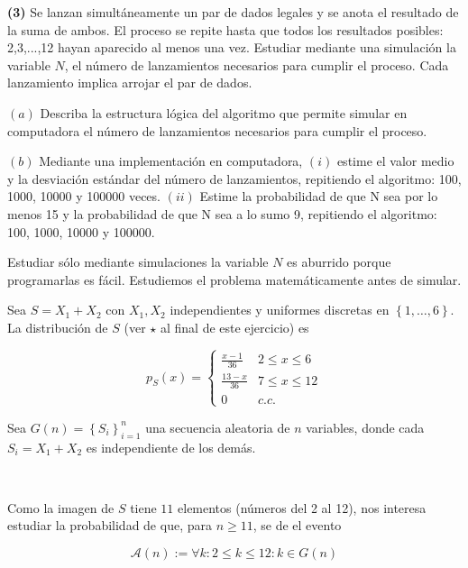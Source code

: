\documentclass[a4paper, 12pt]{article}
\begin{document}
\begin{myframe}
  \textbf{(3)} Se lanzan simultáneamente un par de dados legales y se anota el
  resultado de la suma de ambos. El proceso se repite hasta que todos los
  resultados posibles: 2,3,...,12 hayan aparecido al menos una vez. Estudiar
  mediante una simulación la variable $N$, el número de lanzamientos necesarios
  para cumplir el proceso. Cada lanzamiento implica arrojar el par de dados. 

  $(a)$ Describa la estructura lógica del algoritmo que permite simular en computadora
  el número de lanzamientos necesarios para cumplir el proceso. 

  $(b)$ Mediante una
  implementación en computadora, $(i)$ estime el valor medio y la desviación
  estándar del número de lanzamientos, repitiendo el algoritmo: 100, 1000, 10000
  y 100000 veces. $(ii)$ Estime la probabilidad de que N sea por lo menos 15 y la
  probabilidad de que N sea a lo sumo 9, repitiendo el algoritmo: 100, 1000,
  10000 y 100000.
\end{myframe}

Estudiar sólo mediante simulaciones la variable $N$ es aburrido porque
programarlas es fácil. Estudiemos el problema matemáticamente antes de simular. 

Sea $S = X_1 + X_2$ con $X_1, X_2$ independientes y uniformes discretas en
$\left\{ 1,\ldots, 6 \right\} $. La distribución de $S$ (ver 
$\star$ al final de este ejercicio) es

\begin{equation*}
  p_S(x) = \begin{cases}
    \frac{x-1}{36} &2 \leq x \leq 6 \\ 
    \frac{13-x}{36} &7 \leq x \leq 12 \\ 
    0 &c.c.
  \end{cases}
\end{equation*}

Sea $G(n) = \left\{ S_i\right\}_{i=1}^n $ una secuencia aleatoria
de $n$ variables, donde cada $S_i = X_1 + X_2$ es independiente de los demás.

~

Como la imagen de $S$ tiene $11$ elementos (números del 2 al 12), nos interesa
estudiar la probabilidad de que, para $n \geq 11$, se de el evento 

\begin{equation*}
  \mathcal{A}(n) := \forall k : 2 \leq k \leq 12 : k \in G(n)
\end{equation*}
\end{document}
